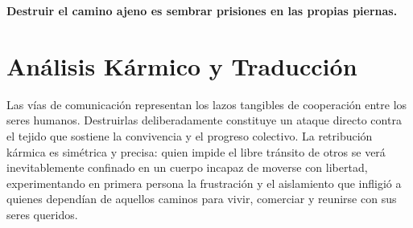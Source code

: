 
\vspace{1em}
\begin{center}
    \textbf{\Large Destruir el camino ajeno es sembrar prisiones en las propias piernas.}
\end{center}
\vspace{1em}

\section{Análisis Kármico y Traducción}
\begin{figure}
  \vspace{-1.5em}
  \begin{center}
  \end{center}
  \vspace{-1.5em}
\end{figure}
Las vías de comunicación representan los lazos tangibles de cooperación entre los seres humanos. Destruirlas deliberadamente constituye un ataque directo contra el tejido que sostiene la convivencia y el progreso colectivo. La retribución kármica es simétrica y precisa: quien impide el libre tránsito de otros se verá inevitablemente confinado en un cuerpo incapaz de moverse con libertad, experimentando en primera persona la frustración y el aislamiento que infligió a quienes dependían de aquellos caminos para vivir, comerciar y reunirse con sus seres queridos.

